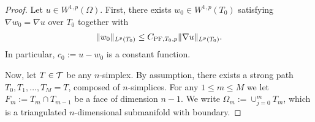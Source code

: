 \documentclass[10pt,letterpaper]{article}
\begin{document}
\begin{proof}
    Let $u \in W^{1,p}(\Omega)$. 
    First, there exists $w_0 \in W^{1,p}(T_{0})$ satisfying $\nabla w_0 = \nabla u$ over $T_{0}$ together with 
    \begin{gather*}
        \| w_0 \|_{L^{p}(T_{0})} \leq C_{{\rm{PF}},T_{0},p} \| \nabla u \|_{L^{p}(T_{0})}.
    \end{gather*}
    In particular, $c_{0} := u - w_0$ is a constant function. 

    Now, let $T \in {\mathcal T}$ be any $n$-simplex. 
    By assumption, there exists a strong path $T_0, T_1, \dots, T_M = T$, composed of $n$-simplices. 
    For any $1 \leq m \leq M$ we let $F_m := T_m \cap T_{m-1}$ be a face of dimension $n-1$. 
    We write $\Omega_m := \cup_{j=0}^{m} T_m$, which is a triangulated $n$-dimensional submanifold with boundary.
    

\end{proof}
\end{document}
